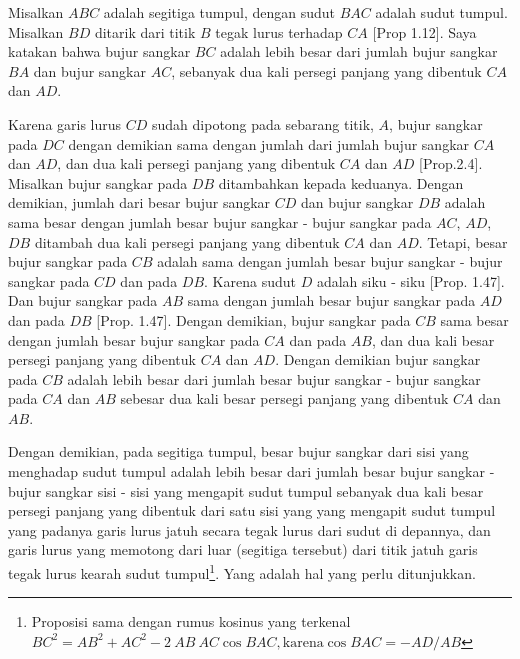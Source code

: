 \documentclass[a4paper]{book}
\begin{document}
\begin{center}
\end{center}

Misalkan $ABC$ adalah segitiga tumpul, dengan sudut $BAC$ adalah sudut tumpul.
Misalkan $BD$ ditarik dari titik $B$ tegak lurus terhadap $CA$ [Prop 1.12]. Saya
katakan bahwa bujur sangkar $BC$ adalah lebih besar dari jumlah bujur sangkar $BA$
dan bujur sangkar $AC$, sebanyak dua kali persegi panjang yang dibentuk $CA$ dan $AD$.

Karena garis lurus $CD$ sudah dipotong pada sebarang titik, $A$, bujur sangkar 
pada $DC$ dengan demikian sama dengan jumlah dari jumlah bujur sangkar $CA$ 
dan $AD$, dan dua kali persegi panjang yang dibentuk $CA$ dan $AD$ [Prop.2.4]. 
Misalkan bujur sangkar pada $DB$ ditambahkan kepada keduanya. Dengan demikian, 
jumlah dari besar bujur sangkar $CD$ dan bujur sangkar $DB$ adalah sama besar
dengan jumlah besar bujur sangkar - bujur sangkar pada $AC$, $AD$, $DB$  ditambah
dua kali persegi panjang yang dibentuk $CA$ dan $AD$. Tetapi, besar bujur sangkar
pada $CB$ adalah sama dengan jumlah besar bujur sangkar - bujur sangkar pada $CD$
dan pada $DB$. Karena sudut $D$ adalah siku - siku [Prop. 1.47]. Dan bujur 
sangkar pada $AB$ sama dengan jumlah besar bujur sangkar pada $AD$ dan pada $DB$ 
[Prop. 1.47]. Dengan demikian, bujur sangkar pada $CB$ sama besar dengan jumlah
besar bujur sangkar pada $CA$ dan pada $AB$, dan dua kali besar persegi panjang
yang dibentuk $CA$ dan $AD$. Dengan demikian bujur sangkar pada $CB$ adalah
lebih besar dari jumlah besar bujur sangkar - bujur sangkar pada $CA$ dan $AB$
sebesar dua kali besar persegi panjang yang dibentuk $CA$ dan $AB$.

Dengan demikian, pada segitiga tumpul, besar bujur sangkar dari sisi yang 
menghadap sudut tumpul adalah lebih besar dari jumlah besar bujur sangkar - 
bujur sangkar sisi - sisi 
yang mengapit sudut tumpul sebanyak dua kali besar persegi panjang yang 
dibentuk dari satu sisi yang yang mengapit sudut tumpul yang padanya garis lurus 
jatuh secara tegak lurus dari sudut di depannya, dan garis lurus yang 
memotong dari luar 
(segitiga tersebut) dari titik jatuh garis tegak lurus kearah sudut 
tumpul\footnote{Proposisi
sama dengan	rumus kosinus yang terkenal 
$BC^2 = AB^2 + AC^2 - 2\ AB\  AC\cos BAC, \text{karena}  \cos BAC = -AD/AB$}. 
Yang adalah hal yang perlu ditunjukkan.
\end{document}
